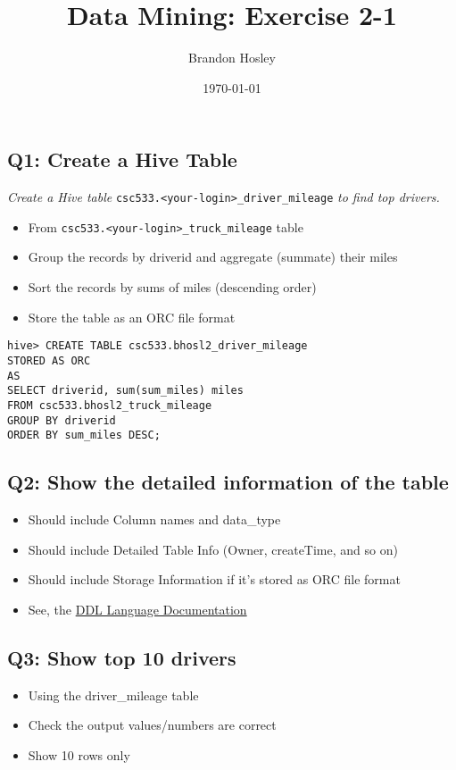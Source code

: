 \documentclass[]{article}
\title{Data Mining: Exercise 2-1}
\author{Brandon Hosley}
\date{\today}
\begin{document}
\maketitle

\vspace{3em}

\subsection*{Q1: Create a Hive Table}
\emph{Create a Hive table}
\texttt{csc533.<your-login>_driver_mileage}
\emph{to find top drivers.} \\
	\begin{itemize}[before=\itshape,font=\normalfont]
		\item From \textnormal{\texttt{csc533.<your-login>_truck_mileage}} table
		\item Group the records by driverid and aggregate (summate) their miles
		\item Sort the records by sums of miles (descending order)
		\item Store the table as an ORC file format
	\end{itemize} 

\begin{verbatim}
hive> CREATE TABLE csc533.bhosl2_driver_mileage
STORED AS ORC
AS
SELECT driverid, sum(sum_miles) miles
FROM csc533.bhosl2_truck_mileage
GROUP BY driverid
ORDER BY sum_miles DESC;
\end{verbatim}

\subsection*{Q2: Show the detailed information of the table}
\begin{itemize}[before=\itshape,font=\normalfont]
	\item Should include Column names and data\_type
	\item Should include Detailed Table Info (Owner, createTime, and so on)
	\item Should include Storage Information if it’s stored as ORC file format
	\item See, the \href{https://cwiki.apache.org/confluence/display/Hive/LanguageManual+DDL#LanguageMan
		ualDDL-DescribeTable/View/MaterializedView/Column}{DDL Language Documentation}
\end{itemize} 
 
\subsection*{Q3: Show top 10 drivers}
\begin{itemize}[before=\itshape,font=\normalfont]
	\item Using the driver\_mileage table
	\item Check the output values/numbers are correct
	\item Show 10 rows only
\end{itemize} 
\end{document}
